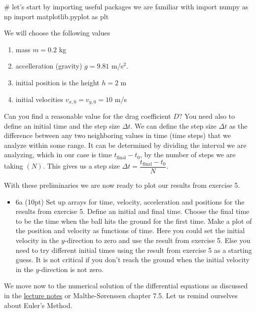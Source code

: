 \documentclass[%
oneside,                 %
final,                   %
10pt]{article}
\begin{document}
\noindent





\bpycod
# let's start by importing useful packages we are familiar with
import numpy as np
import matplotlib.pyplot as plt

\epycod


We will choose the following values
\begin{enumerate}
\item mass $m=0.2$ kg

\item accelleration (gravity) $g=9.81$ m/s$^{2}$.

\item initial position is the height $h=2$ m

\item initial velocities $v_{x,0}=v_{y,0}=10$ m/s
\end{enumerate}

\noindent
Can you find a reasonable value for the drag coefficient $D$?
You need also to define an initial time and 
the step size $\Delta t$. We can define the step size $\Delta t$ as the difference between any
two neighboring values in time (time steps) that we analyze within
some range. It can be determined by dividing the interval we are
analyzing, which in our case is time $t_{\mathrm{final}}-t_0$, by the number of steps we
are taking $(N)$. This gives us a step size $\Delta t = \dfrac{t_{\mathrm{final}}-t_0}{N}$.

With these preliminaries we are now ready to plot our results from exercise 5.

\begin{itemize}
\item 6a (10pt) Set up arrays for time, velocity, acceleration and positions for the results from exercise 5. Define an initial and final time. Choose the final time to be the time when the ball hits the ground for the first time. Make a plot of the position and velocity as functions of time.  Here you could set the initial velocity in the $y$-direction to zero and use the result from exercise 5. Else you need to try different initial times using the result from exercise 5 as a starting guess.  It is not critical if you don't reach the ground when the initial velocity in the $y$-direction is not zero.
\end{itemize}

\noindent
We move now to the numerical solution of the differential equations as discussed in the \href{{https://mhjensen.github.io/Physics321/doc/pub/motion/html/motion.html}}{lecture notes} or Malthe-Sørenssen chapter 7.5.
Let us remind ourselves about  Euler's Method.
\end{document}
